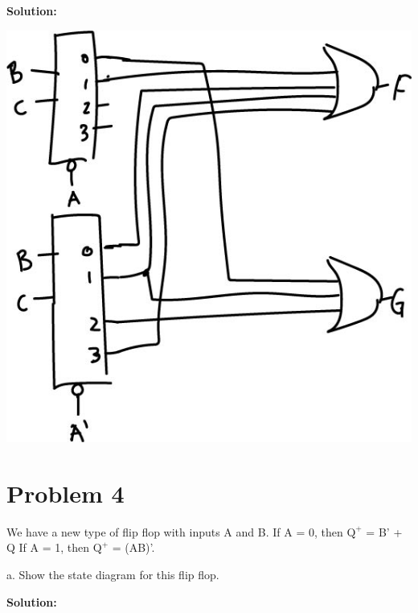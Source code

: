 \documentclass{article}
\begin{document}
    \textbf{Solution:}

    \begin{center}
        \includegraphics[scale=.35]{HW4_q3_b.jpg}
    \end{center}


    \section*{Problem 4}

    We have a new type of flip flop with inputs A and B. If A = 0,
    then $\text{Q}^+$ = B’ + Q If A = 1, then $\text{Q}^+$ = (AB)’.

    a. Show the state diagram for this flip flop.

    \textbf{Solution:}
\end{document}
